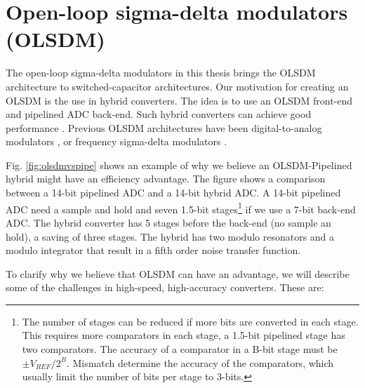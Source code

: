 
\section{Open-loop sigma-delta modulators (OLSDM)}
The open-loop sigma-delta
modulators in this thesis brings the OLSDM architecture to
switched-capacitor architectures. Our motivation for creating an OLSDM
is the use in hybrid converters. The idea is to use an OLSDM front-end and pipelined ADC
back-end. Such hybrid converters can achieve good performance
\cite{brooks97}. 
Previous OLSDM architectures have been digital-to-analog
modulators \cite{wisland03a}, or frequency sigma-delta modulators \cite{hovin97}. 



Fig. \ref{fig:olsdmvspipe} shows an example of why we believe an
OLSDM-Pipelined hybrid might have an efficiency advantage. The figure
shows a comparison between a 14-bit pipelined ADC and a 14-bit hybrid
ADC.
A 14-bit pipelined ADC need
a sample and hold  and seven 1.5-bit stages\footnote{The
  number of stages can be reduced if more bits are
converted in each stage. This requires more comparators in each stage,
a 1.5-bit pipelined stage has two comparators. The accuracy of a
comparator in a B-bit stage must be $\pm V_{REF}/2^B$. Mismatch determine
the accuracy of the comparators, which usually limit the number of bits per
stage to 3-bits.} if we use a 7-bit back-end ADC. 
The hybrid converter has 5 stages before the back-end (no sample an hold), a saving of three
stages. The hybrid has two modulo resonators and a modulo integrator
that result in a fifth order noise transfer function.

To clarify why we believe that OLSDM can have an advantage, we will
describe some of the challenges in high-speed, high-accuracy
converters. These are:

